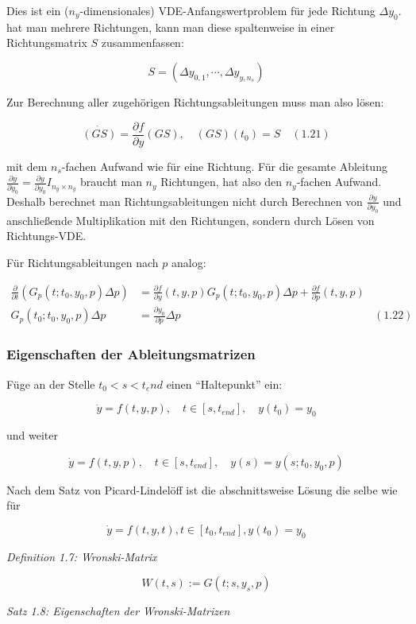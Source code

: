 Dies ist ein ($n_y$-dimensionales) VDE-Anfangswertproblem für jede Richtung $\Delta y_0$. hat man mehrere Richtungen, kann man diese spaltenweise in einer Richtungsmatrix $S$ zusammenfassen:

\[ S = ( \Delta y_{0,1}, \cdots, \Delta y_{y,n_s}) \]

Zur Berechnung aller zugehörigen Richtungsableitungen muss man also lösen:

\[ \dot{(GS)} = \frac{\partial f}{\partial y} (GS), \quad (GS)(t_0) = S \quad (1.21) \]

mit dem $n_s$-fachen Aufwand wie für eine Richtung. Für die gesamte Ableitung $\frac{\partial y}{\partial y_0} = \frac{\partial y}{\partial y_0} I_{n_y \times n_y}$ braucht man $n_y$ Richtungen, hat also den $n_y$-fachen Aufwand. Deshalb berechnet man Richtungsableitungen nicht durch Berechnen von $\frac{\partial y}{\partial y_0}$ und anschließende Multiplikation mit den Richtungen, sondern durch Lösen von Richtungs-VDE.

Für Richtungsableitungen nach $p$ analog:

\begin{align*}
\frac \partial{\partial t} (G_p(t;t_0,y_0,p) \Delta p) &= \frac{\partial f}{\partial y} (t,y,p) G_p(t;t_0,y_0,p) \Delta p + \frac{\partial f}{\partial p}(t,y,p) \\
G_p(t_0; t_0, y_0, p) \Delta p &= \frac{\partial y_0}{\partial p} \Delta p & (1.22) 
\end{align*}

\subsubsection*{Eigenschaften der Ableitungsmatrizen}

Füge an der Stelle $t_0 < s < t_end$ einen "`Haltepunkt"' ein:

\[\dot y = f(t,y,p),\quad t\in[s,t_{end}],\quad y(t_0) = y_0\]

und weiter

\[\dot y = f(t,y,p),\quad t\in[s,t_{end}],\quad y(s) = y(s; t_0, y_0, p) \]

Nach dem Satz von Picard-Lindelöff ist die abschnittsweise Lösung die selbe wie für

\[\dot y = f(t,y,t), t\in[t_0,t_{end}], y(t_0) = y_0 \]

\emph{Definition 1.7: Wronski-Matrix}

\[W(t,s) := G(t; s, y_s, p) \]

\emph{Satz 1.8: Eigenschaften der Wronski-Matrizen}


